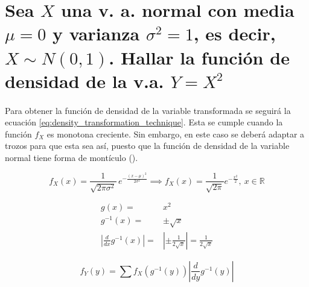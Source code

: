 \documentclass{article}
\begin{document}
	\maketitle
  \thispagestyle{empty}



	\section{Sea $X$ una v. a. normal con media $\mu = 0$ y varianza $\sigma^2 = 1$, es decir, $ X \sim N(0,1)$. Hallar la función de densidad de la v.a. $Y = X^2$}

    \paragraph{}
    Para obtener la función de densidad de la variable transformada se seguirá la ecuación \eqref{eq:density_transformation_technique}. Esta se cumple cuando la función $f_X$ es monotona creciente. Sin embargo, en este caso se deberá adaptar a trozos para que esta sea así, puesto que la función de densidad de la variable normal tiene forma de montículo ().


    \begin{equation}
      f_X(x) = {\displaystyle {\frac {1}{\sqrt {2\pi \sigma ^{2}}}}\,e^{-{\frac {(x-\mu )^{2}}{2\sigma ^{2}}}}} \implies f_X(x) = \frac{1}{\sqrt{2\pi} } e^{-\frac{x^2}{2}}, \ x \in \mathbb{R}
    \end{equation}


    \begin{align}
      g(x) =& x^2 \\
      g^{-1}(x) =& \pm \sqrt{x} \\
      \left| \frac{d}{dx} g^{-1} (x) \right| =& \left| \pm \frac{1}{2\sqrt{x}}  \right| = \frac{1}{2\sqrt{x}}
    \end{align}

    \begin{equation}
    \label{eq:density_transformation_technique}
      f_Y (y) = \sum f_X \left( g^{-1} (y) \right) \left| \frac{d}{dy} g^{-1} (y) \right|
    \end{equation}
\end{document}
